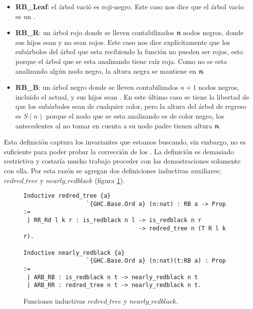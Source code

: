\begin{itemize}
        \item \textbf{RB\_Leaf}: el árbol vació es roji-negro. Este caso nos dice que el \'arbol
        vacío es un {\arn}.
        \item \textbf{RB\_R}: un árbol rojo donde se lleven contabilizados \textbf{\textit{n}} nodos 
        negros, donde sus hijos sean {\arns} y no sean rojos. Este caso nos dice explícitamente que 
        los subárboles del árbol que esta recibiendo la función no pueden ser rojos, esto porque el 
        árbol que se esta analizando tiene raíz roja. Como no se esta analizando algún nodo negro, 
        la altura negra se mantiene en \textbf{\textit{n}}.
        \item \textbf{RB\_B}: un árbol negro donde se lleven contabilizados $n+1$ nodos negros, 
        incluido el actual, y sus hijos sean {\arns}. En este \'ultimo caso se tiene la libertad de 
        que los subárboles sean de cualquier color, pero la altura del \'arbol de regreso es $S(n)$ 
        porque el nodo que se esta analizando es de color negro, los antecedentes al no tomar en 
        cuenta a su nodo padre tienen altura \textbf{\textit{n}}.
\end{itemize}

Esta definici\'on captura los invariantes que estamos buscando, sin embargo, no es suficiente para
poder probar la correcci\'on de los {\arns}. La definici\'on es demasiado restrictiva y costaría 
mucho trabajo proceder con las demostraciones solamente con ella. Por esta razón se agregan dos
definiciones inductivas auxiliares; \hyperref[inductive_isRedB]{$redred\_tree$} y 
\hyperref[inductive_isRedB]{$nearly\_redblack$} (figura \ref{inductive_aux}).

\begin{figure}[!ht]
\centering
\captionsetup{justification=centering}
\begin{verbatim}
Inductive redred_tree {a}
                  `{GHC.Base.Ord a} (n:nat) : RB a -> Prop :=
 | RR_Rd l k r : is_redblack n l -> is_redblack n r
                                 -> redred_tree n (T R l k r).

Inductive nearly_redblack {a}
                  `{GHC.Base.Ord a} (n:nat)(t:RB a) : Prop :=
 | ARB_RB : is_redblack n t -> nearly_redblack n t
 | ARB_RR : redred_tree n t -> nearly_redblack n t.
\end{verbatim}
\caption{Funciones inductivas \hyperref[inductive_isRedB]{$redred\_tree$} y 
\hyperref[inductive_isRedB]{$nearly\_redblack$}.}
\label{inductive_aux}
\end{figure}

